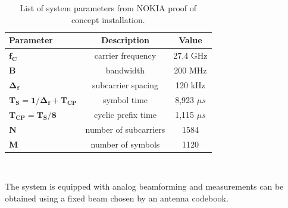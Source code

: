 \begin{table}[H]
	\centering 
	\begin{tabular}{|p{9em} c c |}
		\hline
		\rowcolor{bluepoli!40} %
		\textbf{Parameter} & \textbf{Description} & \textbf{Value}  \T\B \\
		\hline \hline
		$\bm{f_C}$ & carrier frequency & 27,4 GHz \T\B \\
		$\bm{B}$ & bandwidth & 200 MHz \T\B\\
		$\bm{\Delta_f}$ & subcarrier spacing & 120 kHz  \T\B\\
		$\bm{T_S = 1/\Delta_f + T_{CP}}$ & symbol time & 8,923 $\mu s$  \T\B\\
		$\bm{T_{CP} = T_S/8}$ & cyclic prefix time & 1,115 $\mu s$  \T\B\\
		$\bm{N}$ & number of subcarriers & 1584  \T\B\\
		$\bm{M}$ & number of symbols & 1120  \B\\
		
		\hline
	\end{tabular}
	\\[10pt]
	\caption{List of system parameters from NOKIA proof of concept installation.}
	\label{table:PoCparams}
\end{table}

The system is equipped with analog beamforming and measurements can be obtained using a fixed beam chosen by an antenna codebook.
